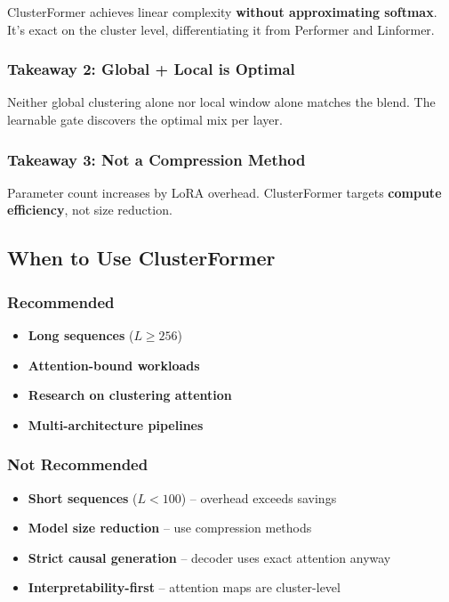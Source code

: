 ClusterFormer achieves linear complexity \textbf{without approximating softmax}. 
It's exact on the cluster level, differentiating it from Performer and 
Linformer.

\subsubsection{Takeaway 2: Global + Local is Optimal}

Neither global clustering alone nor local window alone matches the blend. 
The learnable gate discovers the optimal mix per layer.

\subsubsection{Takeaway 3: Not a Compression Method}

Parameter count increases by LoRA overhead. ClusterFormer targets 
\textbf{compute efficiency}, not size reduction.

\subsection{When to Use ClusterFormer}

\subsubsection{Recommended}

\begin{itemize}
\item \textbf{Long sequences} ($L \geq 256$)
\item \textbf{Attention-bound workloads}
\item \textbf{Research on clustering attention}
\item \textbf{Multi-architecture pipelines}

\end{itemize}
\subsubsection{Not Recommended}

\begin{itemize}
\item \textbf{Short sequences} ($L < 100$) -- overhead exceeds savings
\item \textbf{Model size reduction} -- use compression methods
\item \textbf{Strict causal generation} -- decoder uses exact attention anyway
\item \textbf{Interpretability-first} -- attention maps are cluster-level

\end{itemize}

